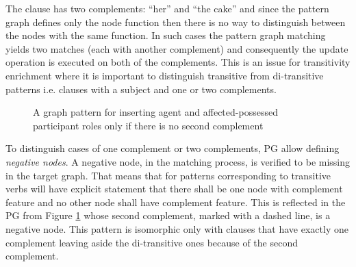 The clause has two complements: ``her'' and ``the cake'' and since the pattern graph defines only the node function then there is no way to distinguish between the nodes with the same function. 
In such cases the pattern graph matching yields two matches (each with another complement) and consequently the update operation is executed on both of the complements. This is an issue for transitivity enrichment where it is important to distinguish transitive from di-transitive patterns i.e. clauses with a subject and one or two complements. 

\begin{figure}[!ht]
	\centering
	\caption{A graph pattern for inserting agent and affected-possessed participant roles only if there is no second complement}
	\label{fig:gp4}
\end{figure}

To distinguish cases of one complement or two complements, PG allow defining \textit{negative nodes}. A negative node, in the matching process, is verified to be missing in the target graph. That means that for patterns corresponding to transitive verbs will have explicit statement that there shall be one node with complement feature and no other node shall have complement feature. This is reflected in the PG from Figure \ref{fig:gp4} whose second complement, marked with a dashed line, is a negative node. This pattern is isomorphic only with clauses that have exactly one complement leaving aside the di-transitive ones because of the second complement.


